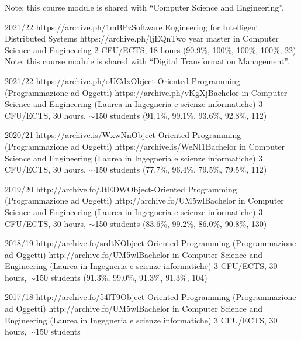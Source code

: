 \begin{outerlist}
        {
            \sedtmeit{}
            Note: this course module is shared with ``Computer Science and Engineering''.
        }
    \item[2021/22]
        \unibocourse %
        {https://archive.ph/1mBPz}{Software Engineering for Intelligent Distributed Systems}
        {https://archive.ph/ljEQn}{Two year master in Computer Science and Engineering}
        {2 CFU/ECTS, 18 hours}
        {(90.9\%, 100\%, 100\%, 100\%, 22)}
        {
            \sedtmeit{}
            Note: this course module is shared with ``Digital Transformation Management''.
        }
    \item[2021/22]
        \unibocourse
        {https://archive.ph/oUCdx}{Object-Oriented Programming (Programmazione ad Oggetti)}
        {https://archive.ph/vKgXj}{Bachelor in Computer Science and Engineering (Laurea in Ingegneria e scienze informatiche)}
        {3 CFU/ECTS, 30 hours, $\sim${}150 students}
        {(91.1\%, 99.1\%, 93.6\%, 92.8\%, 112)}
        {\oopjava}
    \item[2020/21]
        \unibocourse
        {https://archive.is/WxwNn}{Object-Oriented Programming (Programmazione ad Oggetti)}
        {https://archive.is/WeNI1}{Bachelor in Computer Science and Engineering (Laurea in Ingegneria e scienze informatiche)}
        {3 CFU/ECTS, 30 hours, $\sim$150 students}
        {(77.7\%, 96.4\%, 79.5\%, 79.5\%, 112)}
        {\oopjava}
    \item[2019/20]
        \unibocourse
        {http://archive.fo/JtEDW}{Object-Oriented Programming (Programmazione ad Oggetti)}
        {http://archive.fo/UM5wl}{Bachelor in Computer Science and Engineering (Laurea in Ingegneria e scienze informatiche)}
        {3 CFU/ECTS, 30 hours, $\sim$150 students}
        {(83.6\%, 99.2\%, 86.0\%, 90.8\%, 130)}
        {\oopjava}
    \item[2018/19]
        \unibocourse
        {http://archive.fo/srdtN}{Object-Oriented Programming (Programmazione ad Oggetti)}
        {http://archive.fo/UM5wl}{Bachelor in Computer Science and Engineering (Laurea in Ingegneria e scienze informatiche)}
        {3 CFU/ECTS, 30 hours, $\sim$150 students}
        {(91.3\%, 99.0\%, 91.3\%, 91.3\%, 104)}
        {\oopjava}
    \item[2017/18]
        \unibocourse
        {http://archive.fo/54lT9}{Object-Oriented Programming (Programmazione ad Oggetti)}
        {http://archive.fo/UM5wl}{Bachelor in Computer Science and Engineering (Laurea in Ingegneria e scienze informatiche)}
        {3 CFU/ECTS, 30 hours, $\sim$150 students}

\end{outerlist}

